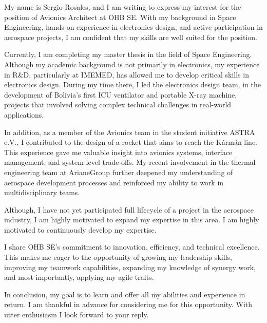 


\begin{cvletter}
My name is Sergio Rosales, and I am writing to express my interest for
the position of Avionics Architect at OHB SE. With my background in
Space Engineering, hands-on experience in electronics design, and
active participation in aerospace projects, I am confident that my
skills are well suited for the position.

Currently, I am completing my master thesis in the field of Space
Engineering. Although my academic background is not primarily in
electronics, my experience in R\&D, particularly at IMEMED, has
allowed me to develop critical skills in electronics design. During my
time there, I led the electronics design team, in the development of
Bolivia's first ICU ventilator and portable X-ray machine, projects
that involved solving complex technical challenges in real-world
applications.

In addition, as a member of the Avionics team in the student
initiative ASTRA e.V., I contributed to the design of a rocket that
aims to reach the Kármán line. This experience gave me valuable
insight into avionics systems, interface management, and system-level
trade-offs. My recent involvement in the thermal engineering team at
ArianeGroup further deepened my understanding of aerospace development
processes and reinforced my ability to work in multidisciplinary
teams.

Although, I have not yet participated full lifecycle of a project in
the aerospace industry, I am highly motivated to expand my expertise
in this area. I am highly motivated to continuously develop my
expertise.

I share OHB SE's commitment to innovation, efficiency, and technical
excellence. This makes me eager to the opportunity of growing my
leadership skills, improving my teamwork capabilities, expanding my
knowledge of synergy work, and most importantly, applying my agile
traits.

In conclusion, my goal is to learn and offer all my abilities and
experience in return. I am thankful in advance for considering me for
this opportunity.\hfill\break
With utter enthusiasm I look forward to your reply.
\end{cvletter}